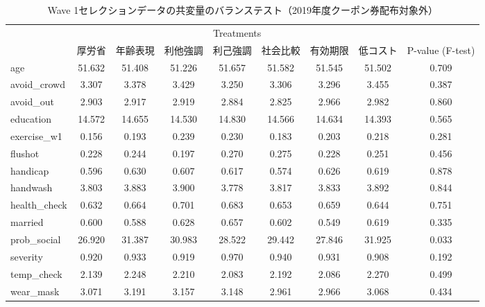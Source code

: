 \documentclass[
  11pt,
  a4paper,
]{article}
\begin{document}
\begin{table}

\caption{\label{tab:BalanceWave1Coupon0}Wave 1セレクションデータの共変量のバランステスト（2019年度クーポン券配布対象外）}
\centering
\fontsize{9}{11}\selectfont
\begin{tabular}[t]{lcccccccc}
\toprule
\multicolumn{1}{c}{ } & \multicolumn{7}{c}{Treatments} & \multicolumn{1}{c}{ } \\
\cmidrule(l{3pt}r{3pt}){2-8}
  & 厚労省 & 年齢表現 & 利他強調 & 利己強調 & 社会比較 & 有効期限 & 低コスト & P-value (F-test)\\
\midrule
age & 51.632 & 51.408 & 51.226 & 51.657 & 51.582 & 51.545 & 51.502 & 0.709\\
avoid\_crowd & 3.307 & 3.378 & 3.429 & 3.250 & 3.306 & 3.296 & 3.455 & 0.387\\
avoid\_out & 2.903 & 2.917 & 2.919 & 2.884 & 2.825 & 2.966 & 2.982 & 0.860\\
education & 14.572 & 14.655 & 14.530 & 14.830 & 14.566 & 14.634 & 14.393 & 0.565\\
exercise\_w1 & 0.156 & 0.193 & 0.239 & 0.230 & 0.183 & 0.203 & 0.218 & 0.281\\
flushot & 0.228 & 0.244 & 0.197 & 0.270 & 0.275 & 0.228 & 0.251 & 0.456\\
handicap & 0.596 & 0.630 & 0.607 & 0.617 & 0.574 & 0.626 & 0.619 & 0.878\\
handwash & 3.803 & 3.883 & 3.900 & 3.778 & 3.817 & 3.833 & 3.892 & 0.844\\
health\_check & 0.632 & 0.664 & 0.701 & 0.683 & 0.653 & 0.659 & 0.644 & 0.751\\
married & 0.600 & 0.588 & 0.628 & 0.657 & 0.602 & 0.549 & 0.619 & 0.335\\
prob\_social & 26.920 & 31.387 & 30.983 & 28.522 & 29.442 & 27.846 & 31.925 & 0.033\\
severity & 0.920 & 0.933 & 0.919 & 0.970 & 0.940 & 0.931 & 0.908 & 0.192\\
temp\_check & 2.139 & 2.248 & 2.210 & 2.083 & 2.192 & 2.086 & 2.270 & 0.499\\
wear\_mask & 3.071 & 3.191 & 3.157 & 3.148 & 2.961 & 2.966 & 3.068 & 0.434\\
\bottomrule
\end{tabular}
\end{table}
\end{document}
